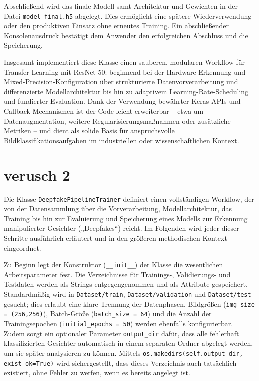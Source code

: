 Abschließend wird das finale Modell samt Architektur und Gewichten in der Datei \texttt{model\_final.h5} abgelegt. Dies ermöglicht eine spätere Wiederverwendung oder den produktiven Einsatz ohne erneutes Training. Ein abschließender Konsolenausdruck bestätigt dem Anwender den erfolgreichen Abschluss und die Speicherung.

Insgesamt implementiert diese Klasse einen sauberen, modularen Workflow für Transfer Learning mit ResNet-50: beginnend bei der Hardware-Erkennung und Mixed-Precision-Konfiguration über strukturierte Datenvorverarbeitung und differenzierte Modellarchitektur bis hin zu adaptivem Learning-Rate-Scheduling und fundierter Evaluation. Dank der Verwendung bewährter Keras-APIs und Callback-Mechanismen ist der Code leicht erweiterbar – etwa um Datenaugmentation, weitere Regularisierungsmaßnahmen oder zusätzliche Metriken – und dient als solide Basis für anspruchsvolle Bildklassifikationsaufgaben im industriellen oder wissenschaftlichen Kontext.


\section{verusch 2}

Die Klasse \texttt{DeepfakePipelineTrainer} definiert einen vollständigen Workflow, der von der Datensammlung über die Vorverarbeitung, Modellarchitektur, das Training bis hin zur Evaluierung und Speicherung eines Modells zur Erkennung manipulierter Gesichter („Deepfakes“) reicht. Im Folgenden wird jeder dieser Schritte ausführlich erläutert und in den größeren methodischen Kontext eingeordnet.

Zu Beginn legt der Konstruktor (\texttt{\_\_init\_\_}) der Klasse die wesentlichen Arbeitsparameter fest. Die Verzeichnisse für Trainings-, Validierungs- und Testdaten werden als Strings entgegengenommen und als Attribute gespeichert. Standardmäßig wird in \texttt{Dataset/train}, \texttt{Dataset/validation} und \texttt{Dataset/test} gesucht; dies erlaubt eine klare Trennung der Datenphasen. Bildgrößen (\texttt{img\_size = (256,256)}), Batch-Größe (\texttt{batch\_size = 64}) und die Anzahl der Trainingsepochen (\texttt{initial\_epochs = 50}) werden ebenfalls konfigurierbar. Zudem sorgt ein optionaler Parameter \texttt{output\_dir} dafür, dass alle fehlerhaft klassifizierten Gesichter automatisch in einem separaten Ordner abgelegt werden, um sie später analysieren zu können. Mittels \texttt{os.makedirs(self.output\_dir, exist\_ok=True)} wird sichergestellt, dass dieses Verzeichnis auch tatsächlich existiert, ohne Fehler zu werfen, wenn es bereits angelegt ist.

